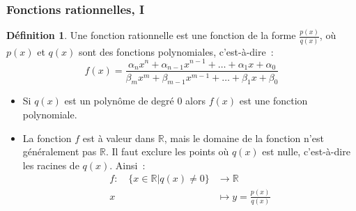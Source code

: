 \documentclass[10pt,notheorems]{beamer}
\theoremstyle{plain}
\theoremstyle{definition} %
\newtheorem{definition}{Définition}
\begin{document}
\begin{frame}
  \frametitle{Fonctions rationnelles, I}
  \hypertarget{slide_fonction_rationnelle_definition}{}

  \bigskip

  \begin{definition}
    Une fonction rationnelle est une fonction de la forme $\frac{p(x)}{q(x)}$, où $p(x)$ et $q(x)$ sont des fonctions polynomiales, c'est-à-dire~:
    \[
      f(x) = \frac{\alpha_n x^n + \alpha_{n-1}x^{n-1} + \ldots + \alpha_1 x + \alpha_0}{\beta_m x^m + \beta_{m-1}x^{m-1} + \ldots + \beta_1 x + \beta_0}
    \]
  \end{definition}

  \bigskip

  \begin{itemize}

  \item Si $q(x)$ est un polynôme de degré 0 alors $f(x)$ est une fonction polynomiale.\newline

  \item La fonction $f$ est à valeur dans $\mathbb R$, mais le domaine de la fonction n'est généralement pas $\mathbb R$. Il faut exclure les points où $q(x)$ est nulle, c'est-à-dire les racines de $q(x)$. Ainsi~:
    \[
      \begin{split}
        f: \quad \{x\in\mathbb R|q(x)\neq 0\} &\longrightarrow \mathbb R\\
        x &\longmapsto y = \frac{p(x)}{q(x)}
      \end{split}
    \]

  \end{itemize}

\end{frame}
\end{document}
